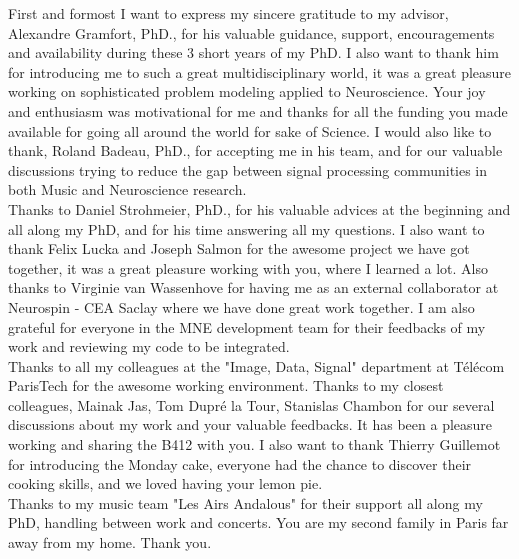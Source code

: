 
\begin{acknowledgements}
\addchaptertocentry{\acknowledgementname} %

\vspace{20pt}
First and formost I want to express my sincere gratitude to my advisor, Alexandre Gramfort, PhD., for his valuable guidance, support, encouragements and availability during these 3 short years of my PhD. I also want to thank him for introducing me to such a great multidisciplinary world, it was a great pleasure working on sophisticated problem modeling applied to Neuroscience. Your joy and enthusiasm was motivational for me and thanks for all the funding you made available for going all around the world for sake of Science. I would also like to thank, Roland Badeau, PhD., for accepting me in his team, and for our valuable discussions trying to reduce the gap between signal processing communities in both Music and Neuroscience research.\\

Thanks to Daniel Strohmeier, PhD., for his valuable advices at the beginning and all along my PhD, and for his time answering all my questions. I also want to thank Felix Lucka and Joseph Salmon for the awesome project we have got together, it was a great pleasure working with you, where I learned a lot. Also thanks to Virginie van Wassenhove for having me as an external collaborator at Neurospin - CEA Saclay where we have done great work together. I am also grateful for everyone in the MNE development team for their feedbacks of my work and reviewing my code to be integrated.
\\

Thanks to all my colleagues at the "Image, Data, Signal" department at Télécom ParisTech for the awesome working environment. Thanks to my closest colleagues, Mainak Jas, Tom Dupré la Tour, Stanislas Chambon for our several discussions about my work and your valuable feedbacks. It has been a pleasure working and sharing the B412 with you. I also want to thank Thierry Guillemot for introducing the Monday cake, everyone had the chance to discover their cooking skills, and we loved having your lemon pie.\\

Thanks to my music team "Les Airs Andalous" for their support all along my PhD, handling between work and concerts. You are my second family in Paris far away from my home. Thank you.\\


\end{acknowledgements}
